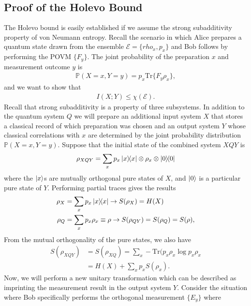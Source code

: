 \documentclass[a4paper, 12pt]{article}
\numberwithin{equation}{section}
\numberwithin{figure}{section}
\theoremstyle{definition}
\begin{document}
    \subsection{Proof of the Holevo Bound}
    The Holevo bound is easily established if we assume the strong subadditivity property of von Neumann entropy. Recall the scenario in which Alice prepares a quantum state drawn from the ensemble $\mathcal{E} = \{ rho_x, p_x \}$ and Bob follows by performing the POVM $\{ F_y \}$. The joint probability of the preparation $x$ and measurement outcome $y$ is
    \begin{align}
        \mathbb{P}(X = x, Y = y) = p_x \text{Tr} \{ F_y \rho_x \},
    \end{align}
    and we want to show that
    \begin{align}
        I(X; Y) \leq \chi(\mathcal{E}).
    \end{align}
    Recall that strong subadditivity is a property of three subsystems. In addition to the quantum system $Q$ we will prepare an additional input system $X$ that stores a classical record of which preparation was chosen and an output system $Y$ whose classical correlations with $x$ are determined by the joint probability distribution $\mathbb{P}(X = x, Y = y)$. Suppose that the initial state of the combined system $XQY$ is
    \begin{align}
        \rho_{XQY} = \sum_x p_x \dyad{x}{x} \otimes \rho_x \otimes \dyad{0}{0}
    \end{align}
    where the $\ket{x}$s are mutually orthogonal pure states of $X$, and $\ket{0}$ is a particular pure state of $Y$. Performing partial traces gives the results
    \begin{align}
        \rho_X &= \sum_x p_x \dyad{x}{x} \to S(\rho_X) = H(X) \\
        \rho_Q &= \sum_x p_x \rho_x \equiv \rho \to S(\rho_{QY}) = S(\rho_Q) = S(\rho),
    \end{align}
    From the mutual orthogonality of the pure states, we also have
    \begin{align}
        S(\rho_{XQY}) &= S(\rho_{XQ}) = \sum_x -\text{Tr}(p_x \rho_x \log p_x \rho_x \\
        &= H(X) + \sum_x p_x S(\rho_x).
    \end{align}
    Now, we will perform a new unitary transformation which can be described as imprinting the measurement result in the output system $Y$. Consider the situation where Bob specifically performs the orthogonal measurement $\{ E_y \}$ where
\end{document}
